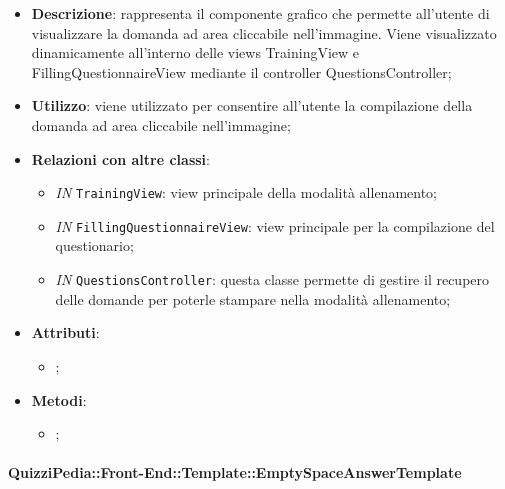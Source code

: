 		\begin{itemize}
			\item \textbf{Descrizione}: rappresenta il componente grafico che permette all'utente di visualizzare la domanda ad area cliccabile nell'immagine. Viene visualizzato dinamicamente all'interno delle views TrainingView e FillingQuestionnaireView mediante il controller QuestionsController;
			\item \textbf{Utilizzo}: viene utilizzato per consentire all'utente la compilazione della domanda ad area cliccabile nell'immagine;
			\item \textbf{Relazioni con altre classi}: 
			\begin{itemize}
				\item \textit{IN} \texttt{TrainingView}: view principale della modalità allenamento; 
				\item \textit{IN} \texttt{FillingQuestionnaireView}: view principale per la compilazione del questionario;
				\item \textit{IN} \texttt{QuestionsController}: questa classe permette di gestire il recupero delle domande per poterle stampare nella modalità allenamento;
			\end{itemize}
			\item \textbf{Attributi}: 
			\begin{itemize}
				\item ;
			\end{itemize}
			\item \textbf{Metodi}: 
			\begin{itemize}
				\item ;
			\end{itemize}
		\end{itemize}
	
		\paragraph{QuizziPedia::Front-End::Template::EmptySpaceAnswerTemplate}
		
		\label{QuizziPedia::Front-End::Templates::EmptySpaceAnswerTemplate}
		
